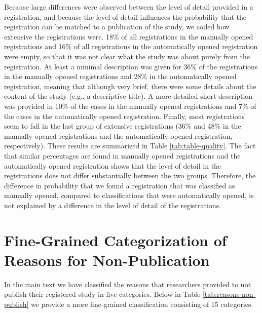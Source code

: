 \documentclass[
  ,jou, a4paper,floatsintext]{apa6}
\begin{document}
Because large differences were observed between the level of detail provided in a registration, and because the level of detail influences the probability that the registration can be matched to a publication of the study, we coded how extensive the registrations were. 18\% of all registrations in the manually opened registrations and 16\% of all registrations in the automatically opened registration were empty, so that it was not clear what the study was about purely from the registration. At least a minimal description was given for 36\% of the registrations in the manually opened registrations and 28\% in the automatically opened registration, meaning that although very brief, there were some details about the content of the study (e.g., a descriptive title). A more detailed short description was provided in 10\% of the cases in the manually opened registrations and 7\% of the cases in the automatically opened registration. Finally, most registrations seem to fall in the last group of extensive registrations (36\% and 48\% in the manually opened registrations and the automatically opened registration, respectively). These results are summarized in Table \ref{tab:table-quality}. The fact that similar percentages are found in manually opened registrations and the automatically opened registration shows that the level of detail in the registrations does not differ substantially between the two groups. Therefore, the difference in probability that we found a registration that was classified as manually opened, compared to classifications that were automatically opened, is not explained by a difference in the level of detail of the registrations.

\hypertarget{fine-grained-categorization-of-reasons-for-non-publication}{%
\section{Fine-Grained Categorization of Reasons for Non-Publication}\label{fine-grained-categorization-of-reasons-for-non-publication}}

In the main text we have classified the reasons that researchers provided to not publish their registered study in five categories. Below in Table \ref{tab:reasons-non-publish} we provide a more fine-grained classification consisting of 15 categories.
\end{document}

